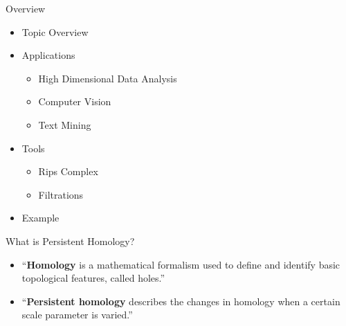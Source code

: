 






\begin{frame}
    \titlepage
\end{frame}

\begin{frame}{Overview}
	\begin{itemize}[<+->]
		\item Topic Overview
		\item Applications
			\begin{itemize}[<+->]
				\item High Dimensional Data Analysis
				\item Computer Vision
				\item Text Mining
			\end{itemize}
		\item Tools
			\begin{itemize}[<+->]
				\item Rips Complex
				\item Filtrations
			\end{itemize}
		\item Example
	\end{itemize}
\end{frame}

\begin{frame}{What is Persistent Homology?}
	\begin{itemize}[<+->]
		\item ``\textbf{Homology} is a mathematical formalism used to deﬁne and identify basic topological features, called holes.'' \cite{wagner}
		\item ``\textbf{Persistent homology} describes the changes in homology when a certain scale parameter is varied.'' \cite{wagner}
	\end{itemize}
	\begin{figure}[]
		\centering
		\caption{\cite{dey}}
	\end{figure}
\end{frame}


